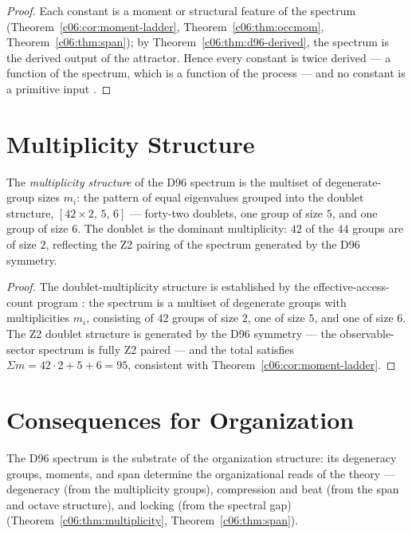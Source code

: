 \begin{proof}
Each constant is a moment or structural feature of the spectrum
(Theorem~\ref{c06:cor:moment-ladder}, Theorem~\ref{c06:thm:occmom}, Theorem~\ref{c06:thm:span});
by Theorem~\ref{c06:thm:d96-derived}, the spectrum is the derived output of the attractor.
Hence every constant is twice derived --- a function of the spectrum, which is a function of
the process --- and no constant is a primitive input \cite{c06:QG157,c06:QG295}.
\end{proof}

\section{Multiplicity Structure}
\label{c06:sec:multiplicity}

\begin{theorem}
\label{c06:thm:multiplicity}
The \emph{multiplicity structure} of the D96 spectrum is the multiset of degenerate-group
sizes $m_i$: the pattern of equal eigenvalues grouped into the doublet structure,
$[42\times2,\,5,\,6]$ --- forty-two doublets, one group of size $5$, and one group of size
$6$. The doublet is the dominant multiplicity: $42$ of the $44$ groups are of size $2$,
reflecting the Z2 pairing of the spectrum generated by the D96 symmetry.
\end{theorem}

\begin{proof}
The doublet-multiplicity structure is established by the effective-access-count program
\cite{c06:QG157}: the spectrum is a multiset of degenerate groups with multiplicities $m_i$,
consisting of $42$ groups of size $2$, one of size $5$, and one of size $6$. The Z2 doublet
structure is generated by the D96 symmetry \cite{c06:QG155} --- the observable-sector
spectrum is fully Z2 paired --- and the total satisfies
$\Sigma m = 42\cdot2 + 5 + 6 = 95$, consistent with Theorem~\ref{c06:cor:moment-ladder}.
\end{proof}

\section{Consequences for Organization}
\label{c06:sec:organization}

The D96 spectrum is the substrate of the organization structure: its degeneracy groups,
moments, and span determine the organizational reads of the theory --- degeneracy (from the
multiplicity groups), compression and beat (from the span and octave structure), and
locking (from the spectral gap)
(Theorem~\ref{c06:thm:multiplicity}, Theorem~\ref{c06:thm:span}).

